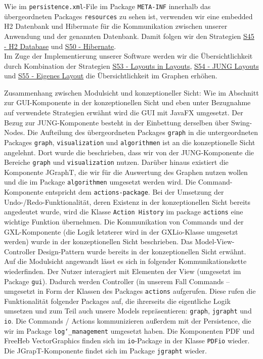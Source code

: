 \documentclass[enabledeprecatedfontcommands,fontsize=11pt,paper=a4,twoside]{scrartcl}
\newcounter{one}
\begin{document}
Wie im \texttt{persistence.xml}-File im Package \texttt{META-INF} innerhalb das übergeordneten Packages \texttt{resources} zu sehen ist, verwenden wir eine embedded H2 Datenbank und Hibermate für die Kommunikation zwischen unserer Anwendung und der genannten Datenbank. Damit folgen wir den Strategien \hyperlink{ppp}{S45 - H2 Database} und \hyperlink{rrr}{S50 - Hibernate}. \\

Im Zuge der Implementierung unserer Software werden wir die Übersichtlichkeit durch Kombination der Strategien \hyperlink{sss}{S53 - Layouts in Layouts}, \hyperlink{xee}{S54 - JUNG Layouts} und \hyperlink{xff}{S55 - Eigenes Layout} die Übersichtlichkeit im Graphen erhöhen.

Zusammenhang zwischen Modulsicht und konzeptioneller Sicht: Wie im Abschnitt zur GUI-Komponente  in der konzeptionellen Sicht und eben unter Bezugnahme auf verwendete Strategien erwähnt wird die GUI mit JavaFX umgesetzt. Der Bezug zur JUNG-Komponente besteht in der Einbettung derselben über Swing-Nodes. Die Aufteilung des übergeordneten Packages \texttt{graph} in die untergeordneten Packages \texttt{graph}, \texttt{visualization} und \texttt{algorithmen} ist an die konzeptionelle Sicht angelehnt. Dort wurde die beschrieben, dass wir von der JUNG-Komponente die Bereiche \texttt{graph} und \texttt{visualization}  nutzen. Darüber hinaus existiert die Komponente JGraphT, die wir für die Auswertung des Graphen nutzen wollen und die im Package \texttt{algorithmen} umgesetzt werden wird. Die Command-Komponente entspricht dem \texttt{actions-package}. Bei der Umsetzung der Undo-/Redo-Funktionalität, deren Existenz in der konzeptionellen Sicht bereits angedeutet wurde, wird die Klasse \texttt{Action History} im package \texttt{actions} eine wichtige Funktion übernehmen. Die Kommunikation von Commands und der GXL-Komponente (die Logik letzterer wird in der GXLio-Klasse umgesetzt werden) wurde in der konzeptionellen Sicht beschrieben. Das Model-View-Controller Design-Pattern wurde bereits in der konzeptionellen Sicht erwähnt. Auf die Modulsicht angewandt lässt es sich in folgender Kommunikationskette wiederfinden. Der Nutzer interagiert mit Elementen der View (umgesetzt im Package \texttt{gui}). Dadurch werden Controller (in unserem Fall Commands – umgesetzt in Form der Klassen des Packages \texttt{actions} aufgerufen. Diese rufen die Funktionalität folgender Packages auf, die ihrerseits die eigentliche Logik umsetzen und zum Teil auch unsere Models repräsentieren: \texttt{graph}, \texttt{jgrapht} und \texttt{io}. Die Commands / Actions kommunizieren außerdem mit der Persistence, die wir im Package \texttt{log\char`_management} umgesetzt haben. Die Komponenten PDF und FreeHeb VectorGraphics finden sich im \texttt{io}-Package in der Klasse \texttt{PDFio} wieder. Die JGrapT-Komponente findet sich im Package \texttt{jgrapht}  wieder. \\ \\
\end{document}
